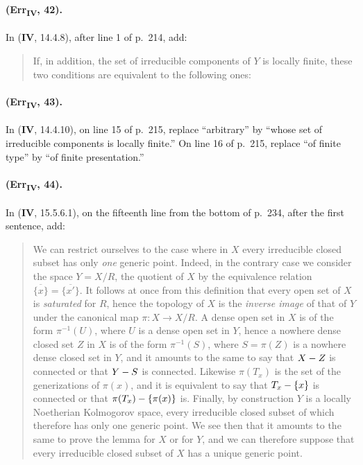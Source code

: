 {\paragraph{(Err\textsubscript{\textmd{IV}}, 42).}
In (\textbf{IV}, 14.4.8), after line 1 of p.~214, add:
\begin{quote}
If, in addition, the set of irreducible components of $Y$ is locally
finite, these two conditions are equivalent to the following ones:
\end{quote}

\paragraph{(Err\textsubscript{\textmd{IV}}, 43).}
In (\textbf{IV}, 14.4.10), on line 15 of p.~215, replace ``arbitrary'' by ``whose
set of irreducible components is locally finite.''  On line 16 of
p.~215, replace ``of finite type'' by ``of finite presentation.''

\paragraph{(Err\textsubscript{\textmd{IV}}, 44).}
In (\textbf{IV}, 15.5.6.1), on the fifteenth line from the bottom of p.~234,
after the first sentence, add:

\begin{quote}
We can restrict ourselves to the case where in $X$ every irreducible closed subset
has only \emph{one} generic point. Indeed, in the contrary case we
consider the space $Y=X/R$,
the quotient of $X$ by the equivalence relation
$\overline{\{x\}}=\overline{\{x'\}}$. It follows at once from this
definition that every open set of $X$ is \emph{saturated} for $R$, hence the topology
of $X$ is the \emph{inverse image} of that of $Y$ under the canonical
map $\pi:X\to X/R$. A dense open set in $X$ is of the form
$\pi^{-1}(U)$, where $U$ is a dense open set in $Y$, hence a nowhere dense closed set
$Z$ in $X$ is of the form $\pi^{-1}(S)$, where $S=\pi(Z)$ is a nowhere dense
closed set in $Y$, and it amounts to the same to say that $X- Z$ is connected or
that $Y- S$ is connected. Likewise $\pi(T_x)$ is the set of the
generizations of $\pi(x)$, and it is equivalent to say that
$T_x-\{x\}$ is connected or that $\pi(T_x)-\{\pi(x)\}$ is. Finally, by
construction $Y$ is a locally Noetherian Kolmogorov space,
every irreducible closed subset of which therefore has only one generic point. We see
then that it amounts to the same to prove the lemma for $X$ or for $Y$,
and we can therefore suppose that every irreducible closed subset of $X$ has
a unique generic point.
\end{quote}

}
